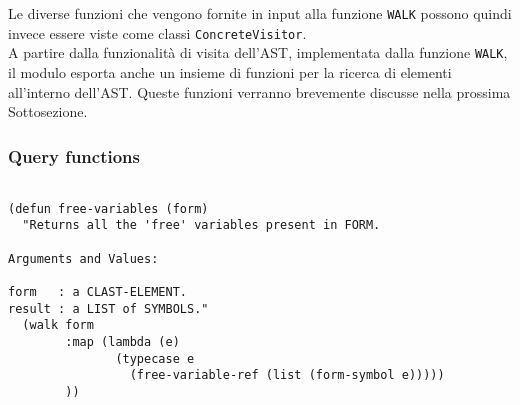 Le diverse funzioni che vengono fornite in input alla funzione \texttt{WALK}
possono quindi invece essere viste come classi \texttt{ConcreteVisitor}.\\


A partire dalla funzionalità di visita dell'AST, implementata dalla funzione
\texttt{WALK}, il modulo esporta anche un insieme di funzioni per la ricerca di
elementi all'interno dell'AST. Queste funzioni verranno brevemente discusse
nella prossima Sottosezione.

\subsubsection{Query functions}

\begin{lstlisting}[caption=Query functions per l'identificazione di variabili
libere all'interno di una form Common Lisp]

(defun free-variables (form)
  "Returns all the 'free' variables present in FORM.

Arguments and Values:

form   : a CLAST-ELEMENT.
result : a LIST of SYMBOLS."
  (walk form
        :map (lambda (e)
               (typecase e
                 (free-variable-ref (list (form-symbol e)))))
        ))

\end{lstlisting}





